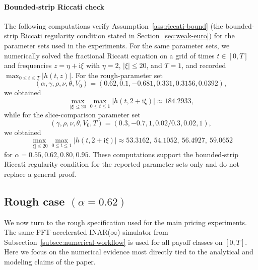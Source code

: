 \documentclass[letterpaper]{article}
\numberwithin{equation}{section}
\theoremstyle{definition}
\theoremstyle{remark}
\newcommand{\ii}{\mathrm{i}}
\begin{document}
\paragraph{Bounded-strip Riccati check}
{The following computations verify Assumption~\ref{ass:riccati-bound} (the bounded-strip Riccati regularity condition stated in Section~\ref{sec:weak-euro}) for the parameter sets used in the experiments.}
For the same parameter sets, we numerically solved the fractional Riccati
equation on a grid of times $t\in[0,T]$ and frequencies
$z=\eta+\ii\xi$ with $\eta=2$, $|\xi|\le 20$, and $T=1$, and recorded
$\max_{0\le t\le T}|h(t,z)|$. For the rough-parameter set
\[
  (\alpha,\gamma,\rho,\nu,\theta,V_0)=(0.62,0.1,-0.681,0.331,0.3156,0.0392),
\]
we obtained
\[
  \max_{|\xi|\le 20}\max_{0\le t\le 1}|h(t,2+\ii\xi)| \approx 184.2933,
\]
while for the slice-comparison parameter set
\[
  (\gamma,\rho,\nu,\theta,V_0,T)=(0.3,-0.7,1,0.02/0.3,0.02,1),
\]
we obtained
\[
  \max_{|\xi|\le 20}\max_{0\le t\le 1}|h(t,2+\ii\xi)|
  \approx 53.3162,\ 54.1052,\ 56.4927,\ 59.0652
\]
for $\alpha=0.55,0.62,0.80,0.95$. These computations support the bounded-strip
Riccati regularity condition for the reported parameter sets only and do not
replace a general proof.


\subsection{Rough case \texorpdfstring{$(\alpha=0.62)$}{(alpha=0.62)}}

We now turn to the rough specification used for the main pricing experiments.
The same FFT-accelerated INAR($\infty$) simulator from
Subsection~\ref{subsec:numerical-workflow} is used for all payoff classes on
$[0,T]$. Here we focus on the numerical evidence most directly tied to the
analytical and modeling claims of the paper.
\end{document}
